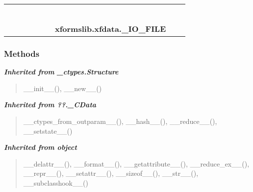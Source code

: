     \label{xformslib:xfdata:_IO_FILE}
\begin{tabular}{cccccccccc}
\multicolumn{2}{r}{\settowidth{\BCL}{object}\multirow{2}{\BCL}{object}}
&&
&&
&&
  \\\cline{3-3}
  &&\multicolumn{1}{c|}{}
&&
&&
&&
  \\
\multicolumn{4}{r}{\settowidth{\BCL}{??.\_CData}\multirow{2}{\BCL}{??.\_CData}}
&&
&&
  \\\cline{5-5}
  &&&&\multicolumn{1}{c|}{}
&&
&&
  \\
\multicolumn{6}{r}{\settowidth{\BCL}{\_ctypes.Structure}\multirow{2}{\BCL}{\_ctypes.Structure}}
&&
  \\\cline{7-7}
  &&&&&&\multicolumn{1}{c|}{}
&&
  \\
&&&&&&\multicolumn{2}{l}{\textbf{xformslib.xfdata.\_IO\_FILE}}
\end{tabular}



  \subsubsection{Methods}


\large{\textbf{\textit{Inherited from \_ctypes.Structure}}}

\begin{quote}
\_\_init\_\_(), \_\_new\_\_()
\end{quote}

\large{\textbf{\textit{Inherited from ??.\_CData}}}

\begin{quote}
\_\_ctypes\_from\_outparam\_\_(), \_\_hash\_\_(), \_\_reduce\_\_(), \_\_setstate\_\_()
\end{quote}

\large{\textbf{\textit{Inherited from object}}}

\begin{quote}
\_\_delattr\_\_(), \_\_format\_\_(), \_\_getattribute\_\_(), \_\_reduce\_ex\_\_(), \_\_repr\_\_(), \_\_setattr\_\_(), \_\_sizeof\_\_(), \_\_str\_\_(), \_\_subclasshook\_\_()
\end{quote}


